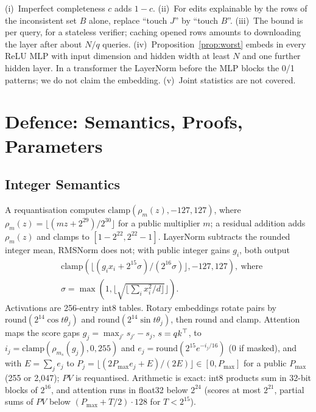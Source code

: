 \begin{remark}[scope]
\label{rem:scope}
(i)~Imperfect completeness $c$ adds $1-c$. (ii)~For edits explainable by the rows of the
inconsistent set $B$ alone, replace ``touch $J$'' by ``touch $B$''. (iii)~The bound is per query,
for a stateless verifier; caching opened rows amounts to downloading the layer after about $N/q$
queries. (iv)~Proposition~\ref{prop:worst} embeds in every ReLU MLP with input dimension and hidden
width at least $N$ and one further hidden layer. In a transformer the LayerNorm before the MLP
blocks the 0/1 patterns; we do not claim the embedding. (v)~Joint statistics are not covered.
\end{remark}

\section{Defence: Semantics, Proofs, Parameters}
\label{app:defence}

\subsection{Integer Semantics}
\label{app:semantics}

A requantisation computes $\mathrm{clamp}(\rho_m(z),-127,127)$, where
$\rho_m(z)=\lfloor(mz+2^{29})/2^{30}\rfloor$ for a public multiplier $m$; a residual addition adds
$\rho_m(z)$ and clamps to $[1-2^{22},2^{22}-1]$. LayerNorm subtracts the rounded integer mean, RMSNorm does not; with public
integer gains $g_i$, both output
\begin{align*}
  &\mathrm{clamp}(\lfloor(g_ix_i+2^{15}\sigma)/(2^{16}\sigma)\rfloor,-127,127),\ \text{where}\\
  &\sigma=\max(1,\lfloor\sqrt{\lfloor\textstyle\sum_ix_i^2/d\rfloor}\rfloor).
\end{align*}
Activations are 256-entry int8 tables. Rotary embeddings rotate pairs by
$\mathrm{round}(2^{14}\cos t\theta_j)$ and $\mathrm{round}(2^{14}\sin t\theta_j)$, then round and
clamp. Attention maps the score gaps $g_j=\max_{j'}s_{j'}-s_j$, $s=qk^\top$, to
$i_j=\mathrm{clamp}(\rho_{m_s}(g_j),0,255)$ and $e_j=\mathrm{round}(2^{15}e^{-i_j/16})$ ($0$ if
masked), and with $E=\sum_je_j$ to $P_j=\lfloor(2P_{\max}e_j+E)/(2E)\rfloor\in[0,P_{\max}]$ for a
public $P_{\max}$ (255 or 2{,}047); $PV$ is requantised. Arithmetic is exact: int8
products sum in 32-bit blocks of $2^{16}$, and attention runs in float32 below $2^{24}$ (scores at
most $2^{21}$, partial sums of $PV$ below $(P_{\max}+T/2)\cdot128$ for $T<2^{15}$).

